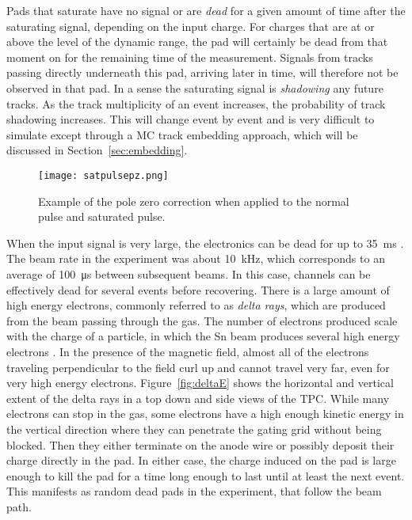 Pads that saturate have no signal or are \emph{dead} for a given amount of time after the saturating signal, depending on the input charge. For charges that are at or above the level of the dynamic range, the pad will certainly be dead from that moment on for the remaining time of the measurement. Signals from tracks passing directly underneath this pad, arriving later in time,  will therefore not be observed in that pad. In a sense the saturating signal is \emph{shadowing} any future tracks. As the track multiplicity of an event increases, the probability of track shadowing increases. This will change event by event and is very difficult to simulate except through a MC track embedding approach, which will be discussed in Section~\ref{sec:embedding}. 

\begin{figure}[!htb]
\centering
\texttt{[image: satpulsepz.png]} 
\caption{Example of the pole zero correction when applied to the normal pulse and saturated pulse.} 
\label{fig:pulseSatTag}
\end{figure}


When the input signal is very large, the electronics can be dead for up to \SI{35}{\milli\second} \cite{akiGET}. The beam rate in the experiment was about \SI{10}{\kilo\hertz}, which corresponds to an average of \SI{100}{\micro\second} between subsequent beams. In this case, channels can be effectively dead for several events before recovering. There is a large amount of high energy electrons, commonly referred to as \emph{delta rays},  which are produced from the beam passing through the gas. The number of electrons produced scale with the charge of a particle, in which the Sn beam produces several high energy electrons \cite{pdg}. In the presence of the magnetic field, almost all of the electrons traveling perpendicular to the field curl up and cannot travel very far, even for very high energy electrons. Figure~\ref{fig:deltaE} shows the horizontal and vertical extent of the delta rays in a top down and side views of the TPC. While many electrons can stop in the gas, some electrons have a high enough kinetic energy in the vertical direction where they can penetrate the gating grid without being blocked. Then they either terminate on the anode wire or possibly deposit their charge directly in the pad. In either case, the charge induced on the pad is large enough to kill the pad for a time long enough to last until at least the next event. This manifests as random dead pads in the experiment, that follow the beam path.  

